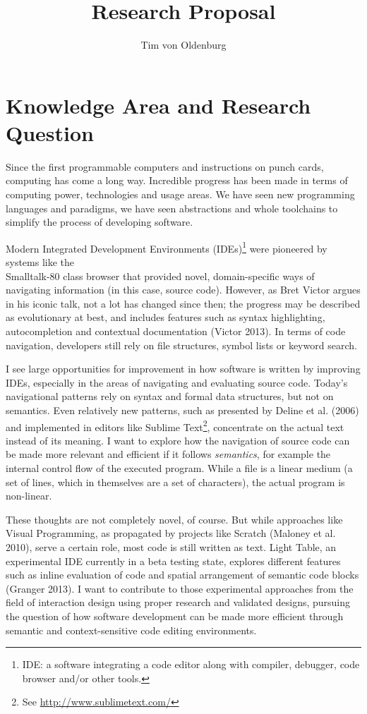 \documentclass{scrartcl}
\begin{document}
\title{Research Proposal}
\author{Tim von Oldenburg}


\maketitle

\section{Knowledge Area and Research Question} Since the first programmable
computers and instructions on punch cards, computing has come a long way.
Incredible progress has been made in terms of computing power, technologies and
usage areas. We have seen new programming languages and paradigms, we have seen
abstractions and whole toolchains to simplify the process of developing software.

Modern Integrated Development Environments (IDEs)\footnote{IDE: a software
integrating a code editor along with compiler, debugger, code browser and/or
other tools.} were pioneered by systems like the\\Smalltalk-80 class browser
that provided novel, domain-specific ways of navigating information (in this
case, source code). However, as Bret Victor argues in his iconic talk, not a lot
has changed since then; the progress may be described as evolutionary at best,
and includes features such as syntax highlighting, autocompletion and contextual
documentation (Victor 2013). In terms of code navigation, developers still rely
on file structures, symbol lists or keyword search.

I see large opportunities for improvement in how software is written by
improving IDEs, especially in the areas of navigating and evaluating source
code. Today's navigational patterns rely on syntax and formal data structures,
but not on semantics. Even relatively new patterns, such as presented by Deline
et al. (2006) and implemented in editors like Sublime Text\footnote{See
\url{http://www.sublimetext.com/}}, concentrate on the actual text instead of its
meaning. I want to explore how the navigation of source code can be made more
relevant and efficient if it follows \textit{semantics}, for example the
internal control flow of the executed program. While a file is a linear medium
(a set of lines, which in themselves are a set of characters), the actual program is
non-linear.

These thoughts are not completely novel, of course. But while approaches like
Visual Programming, as propagated by projects like Scratch (Maloney et al.
2010), serve a certain role, most code is still written as text. Light Table, an
experimental IDE currently in a beta testing state, explores different features
such as inline evaluation of code and spatial arrangement of semantic code
blocks (Granger 2013). I want to contribute to those experimental approaches
from the field of interaction design using proper research and validated
designs, pursuing the question of how software development can be made more
efficient through semantic and context-sensitive code editing environments.
\end{document}
